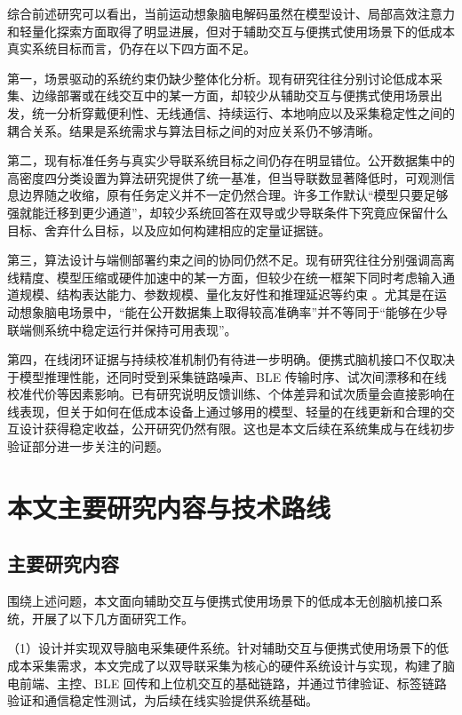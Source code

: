 综合前述研究可以看出，当前运动想象脑电解码虽然在模型设计、局部高效注意力和轻量化探索方面取得了明显进展，但对于辅助交互与便携式使用场景下的低成本真实系统目标而言，仍存在以下四方面不足。

第一，场景驱动的系统约束仍缺少整体化分析。现有研究往往分别讨论低成本采集、边缘部署或在线交互中的某一方面，却较少从辅助交互与便携式使用场景出发，统一分析穿戴便利性、无线通信、持续运行、本地响应以及采集稳定性之间的耦合关系。结果是系统需求与算法目标之间的对应关系仍不够清晰。

第二，现有标准任务与真实少导联系统目标之间仍存在明显错位。公开数据集中的高密度四分类设置为算法研究提供了统一基准，但当导联数显著降低时，可观测信息边界随之收缩，原有任务定义并不一定仍然合理。许多工作默认“模型只要足够强就能迁移到更少通道”，却较少系统回答在双导或少导联条件下究竟应保留什么目标、舍弃什么目标，以及应如何构建相应的定量证据链。

第三，算法设计与端侧部署约束之间的协同仍然不足。现有研究往往分别强调高离线精度、模型压缩或硬件加速中的某一方面，但较少在统一框架下同时考虑输入通道规模、结构表达能力、参数规模、量化友好性和推理延迟等约束 \cite{keu2024compact, wan2023novel, hua2023improved}。尤其是在运动想象脑电场景中，“能在公开数据集上取得较高准确率”并不等同于“能够在少导联端侧系统中稳定运行并保持可用表现”。

第四，在线闭环证据与持续校准机制仍有待进一步明确。便携式脑机接口不仅取决于模型推理性能，还同时受到采集链路噪声、BLE 传输时序、试次间漂移和在线校准代价等因素影响。已有研究说明反馈训练、个体差异和试次质量会直接影响在线表现，但关于如何在低成本设备上通过够用的模型、轻量的在线更新和合理的交互设计获得稳定收益，公开研究仍然有限。这也是本文后续在系统集成与在线初步验证部分进一步关注的问题。

\section{本文主要研究内容与技术路线}
\subsection{主要研究内容}

围绕上述问题，本文面向辅助交互与便携式使用场景下的低成本无创脑机接口系统，开展了以下几方面研究工作。

（1）设计并实现双导脑电采集硬件系统。针对辅助交互与便携式使用场景下的低成本采集需求，本文完成了以双导联采集为核心的硬件系统设计与实现，构建了脑电前端、主控、BLE 回传和上位机交互的基础链路，并通过节律验证、标签链路验证和通信稳定性测试，为后续在线实验提供系统基础。

